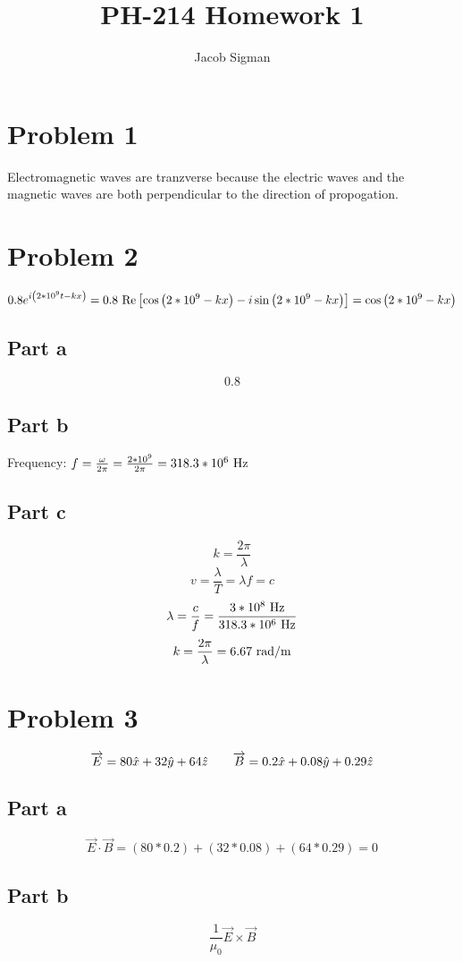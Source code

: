 \documentclass{article}
\title{PH-214 Homework 1}
\author{Jacob Sigman}
\date{}
\begin{document}
\maketitle
\section*{Problem 1}
Electromagnetic waves are tranzverse because the electric waves and the magnetic waves are both perpendicular to the direction of propogation.
\section*{Problem 2}
\[0.8e^{i\left(2*10^9t-kx\right)}=0.8\textnormal{ Re}\left[\cos\left(2*10^9-kx\right)-i\sin\left(2*10^9-kx\right)\right]=\cos\left(2*10^9-kx\right)\]
\subsection*{Part a}
\[0.8\]
\subsection*{Part b}
\begin{center}
Frequency: \(f=\frac{\omega}{2\pi}=\frac{2*10^9}{2\pi}=318.3*10^6 \textnormal{ Hz}\)
\end{center}
\subsection*{Part c}
\begin{center}
\[k=\frac{2\pi}{\lambda}\]
\[v=\frac{\lambda}{T}=\lambda f=c\]
\[\lambda=\frac{c}{f}=\frac{3*10^8 \textnormal{ Hz}}{318.3*10^6 \textnormal{ Hz}}\]
\[k=\frac{2\pi}{\lambda}=6.67 \textnormal{ rad/m}\]
\end{center}
\section*{Problem 3}
\[\overrightarrow{E}=80\hat{x}+32\hat{y}+64\hat{z}\hspace{7 mm}\overrightarrow{B}=0.2\hat{x}+0.08\hat{y}+0.29\hat{z}\]
\subsection*{Part a}
\[\overrightarrow{E}\cdot\overrightarrow{B}=(80*0.2)+(32*0.08)+(64*0.29)=0\]
\subsection*{Part b}
\[\frac{1}{\mu_0}\overrightarrow{E}\times\overrightarrow{B}\]
\end{document}
